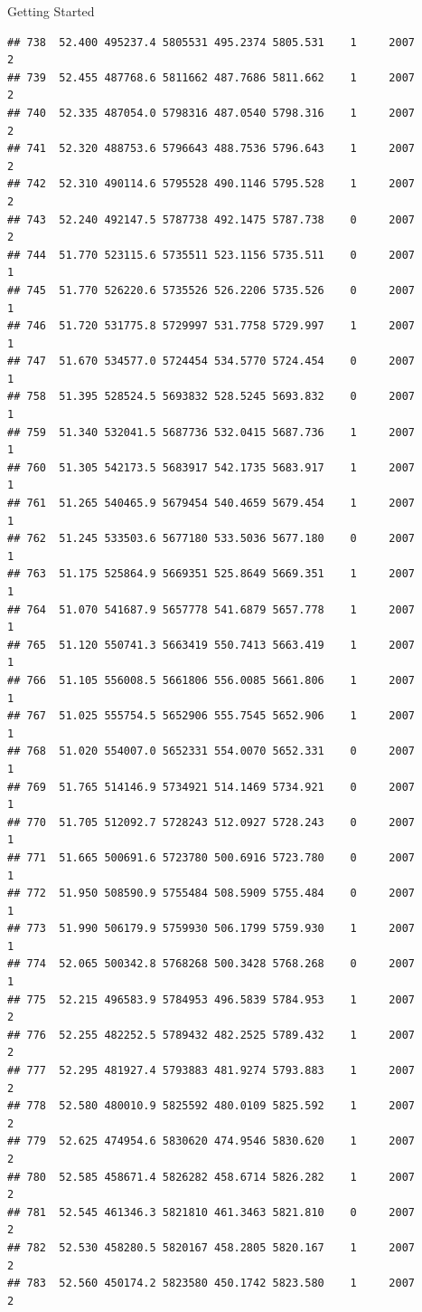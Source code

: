 \documentclass[
  ignorenonframetext,
]{beamer}
\begin{document}
\begin{frame}[fragile]{Getting Started}
\begin{verbatim}
## 738  52.400 495237.4 5805531 495.2374 5805.531    1     2007        2
## 739  52.455 487768.6 5811662 487.7686 5811.662    1     2007        2
## 740  52.335 487054.0 5798316 487.0540 5798.316    1     2007        2
## 741  52.320 488753.6 5796643 488.7536 5796.643    1     2007        2
## 742  52.310 490114.6 5795528 490.1146 5795.528    1     2007        2
## 743  52.240 492147.5 5787738 492.1475 5787.738    0     2007        2
## 744  51.770 523115.6 5735511 523.1156 5735.511    0     2007        1
## 745  51.770 526220.6 5735526 526.2206 5735.526    0     2007        1
## 746  51.720 531775.8 5729997 531.7758 5729.997    1     2007        1
## 747  51.670 534577.0 5724454 534.5770 5724.454    0     2007        1
## 758  51.395 528524.5 5693832 528.5245 5693.832    0     2007        1
## 759  51.340 532041.5 5687736 532.0415 5687.736    1     2007        1
## 760  51.305 542173.5 5683917 542.1735 5683.917    1     2007        1
## 761  51.265 540465.9 5679454 540.4659 5679.454    1     2007        1
## 762  51.245 533503.6 5677180 533.5036 5677.180    0     2007        1
## 763  51.175 525864.9 5669351 525.8649 5669.351    1     2007        1
## 764  51.070 541687.9 5657778 541.6879 5657.778    1     2007        1
## 765  51.120 550741.3 5663419 550.7413 5663.419    1     2007        1
## 766  51.105 556008.5 5661806 556.0085 5661.806    1     2007        1
## 767  51.025 555754.5 5652906 555.7545 5652.906    1     2007        1
## 768  51.020 554007.0 5652331 554.0070 5652.331    0     2007        1
## 769  51.765 514146.9 5734921 514.1469 5734.921    0     2007        1
## 770  51.705 512092.7 5728243 512.0927 5728.243    0     2007        1
## 771  51.665 500691.6 5723780 500.6916 5723.780    0     2007        1
## 772  51.950 508590.9 5755484 508.5909 5755.484    0     2007        1
## 773  51.990 506179.9 5759930 506.1799 5759.930    1     2007        1
## 774  52.065 500342.8 5768268 500.3428 5768.268    0     2007        1
## 775  52.215 496583.9 5784953 496.5839 5784.953    1     2007        2
## 776  52.255 482252.5 5789432 482.2525 5789.432    1     2007        2
## 777  52.295 481927.4 5793883 481.9274 5793.883    1     2007        2
## 778  52.580 480010.9 5825592 480.0109 5825.592    1     2007        2
## 779  52.625 474954.6 5830620 474.9546 5830.620    1     2007        2
## 780  52.585 458671.4 5826282 458.6714 5826.282    1     2007        2
## 781  52.545 461346.3 5821810 461.3463 5821.810    0     2007        2
## 782  52.530 458280.5 5820167 458.2805 5820.167    1     2007        2
## 783  52.560 450174.2 5823580 450.1742 5823.580    1     2007        2

\end{verbatim}
\end{frame}
\end{document}
